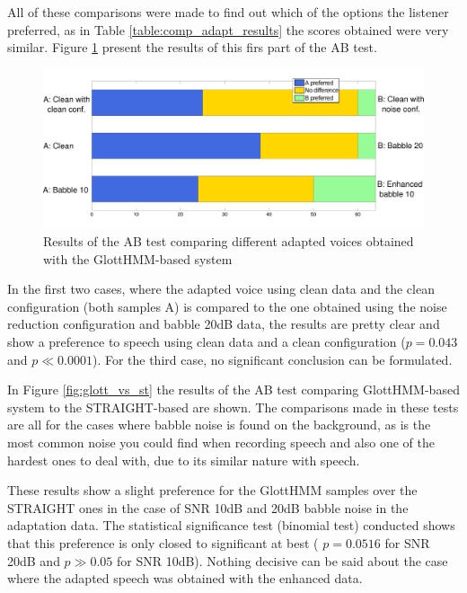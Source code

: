 All of these comparisons were made to find out which of the options the listener preferred, as in Table \ref{table:comp_adapt_results} the scores obtained were very similar.
%
Figure \ref{fig:glott_vs_glott} present the results of this firs part of the AB test.

\begin{figure}[!htb]
  \begin{centering}
  \includegraphics[width=\textwidth]{images/glott_vs_glott.pdf}
  \caption{Results of the AB test comparing different adapted voices obtained with the GlottHMM-based system}
  \label{fig:glott_vs_glott}
  \end{centering}
\end{figure}

In the first two cases, where the adapted voice using clean data and the clean configuration (both samples A) is compared to the one obtained using the noise reduction configuration and babble 20dB data, the results are pretty clear and show a preference to speech using clean data and a clean configuration ($p = 0.043$ and $p \ll 0.0001$).
%
For the third case, no significant conclusion can be formulated.

In Figure \ref{fig:glott_vs_st} the results of the AB test comparing GlottHMM-based system to the STRAIGHT-based are shown.
%
The comparisons made in these tests are all for the cases where babble noise is found on the background, as is the most common noise you could find when recording speech and also one of the hardest ones to deal with, due to its similar nature with speech.

These results show a slight preference for the GlottHMM samples over the STRAIGHT ones in the case of SNR 10dB and 20dB babble noise in the adaptation data.
%
The statistical significance test (binomial test) conducted shows that this preference is only closed to significant at best ( $p = 0.0516$ for SNR 20dB and $p \gg 0.05$ for SNR 10dB).
%
Nothing decisive can be said about the case where the adapted speech was obtained with the enhanced data.

